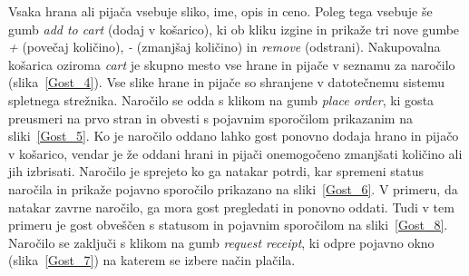 \documentclass[a4paper, 12pt]{book}
\begin{document}
Vsaka hrana ali pijača vsebuje sliko, ime, opis in ceno. Poleg tega vsebuje še gumb \textit{add to cart} (dodaj v košarico), ki ob kliku izgine in prikaže tri nove gumbe \textit{+} (povečaj količino), \textit{-} (zmanjšaj količino) in \textit{remove} (odstrani). Nakupovalna košarica oziroma \textit{cart} je skupno mesto vse hrane in pijače v seznamu za naročilo (slika~\ref{Gost_4}). Vse slike hrane in pijače so shranjene v datotečnemu sistemu spletnega strežnika.
Naročilo se odda s klikom na gumb \textit{place order}, ki gosta preusmeri na prvo stran in obvesti s pojavnim sporočilom prikazanim na sliki~\ref{Gost_5}. Ko je naročilo oddano lahko gost ponovno dodaja hrano in pijačo v košarico, vendar je že oddani hrani in pijači onemogočeno zmanjšati količino ali jih izbrisati. Naročilo je sprejeto ko ga natakar potrdi, kar spremeni status naročila in prikaže pojavno sporočilo prikazano na sliki~\ref{Gost_6}. V primeru, da natakar zavrne naročilo, ga mora gost pregledati in ponovno oddati. Tudi v tem primeru je gost obveščen s statusom in pojavnim sporočilom na sliki~\ref{Gost_8}. Naročilo se zaključi s klikom na gumb \textit{request receipt}, ki odpre pojavno okno (slika~\ref{Gost_7}) na katerem se izbere način plačila.
\end{document}
